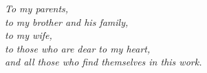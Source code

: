 
\begin{dedication} %
\begin{flushright}
\textit{To my parents,\\
  to my brother and his family,\\
  to my wife,\\
  to those who are dear to my heart,\\
  and all those who find themselves in this work.}
\end{flushright}
\end{dedication}

